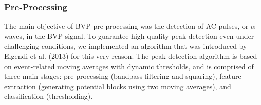 \subsubsection{Pre-Processing}
The main objective of BVP pre-processing was the detection of AC pulses, or $\alpha$ waves, in the BVP signal. To guarantee high quality peak detection even under challenging conditions, we implemented an algorithm that was introduced by Elgendi et al. (2013) for this very reason. The peak detection algorithm is based on event-related moving averages with dynamic thresholds, and is comprised of three main stages: pre-processing (bandpass filtering and squaring), feature extraction (generating potential blocks using two moving averages), and classification (thresholding)\cite{Elgendi2013}. 


